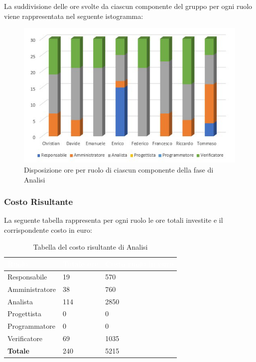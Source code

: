 La suddivisione delle ore svolte da ciascun componente del gruppo per ogni ruolo viene rappresentata nel seguente istogramma:
\begin{figure}[h!]
	\centering	
	\includegraphics[scale=2.60]{Sezioni/Istogrammi/IstogrammaAnalisi.png}
	\caption{Disposizione ore per ruolo di ciascun componente della fase di Analisi}
\end{figure}

\clearpage

\subsubsection{Costo Risultante}
La seguente tabella rappresenta per ogni ruolo le ore totali investite e il corrispondente costo in euro:
{
\renewcommand{\arraystretch}{2}
\begin{longtable}{ C{3cm} C{2cm} C{4cm}}
\caption{Tabella del costo risultante di Analisi}\\

\textcolor{white}{\textbf{Ruolo}} & 
\textcolor{white}{\textbf{Totale ore}} & 
\textcolor{white}{\textbf{Costo ruolo in euro}}\\	
\endhead

Responsabile    &  19 &  570 \\
Amministratore  &  38 &  760 \\
Analista        & 114 & 2850 \\
Progettista     &   0 &    0 \\
Programmatore   &   0 &    0 \\
Verificatore    &  69 & 1035 \\
\textbf{Totale} & 240 & 5215 \\
		
\end{longtable}
}

